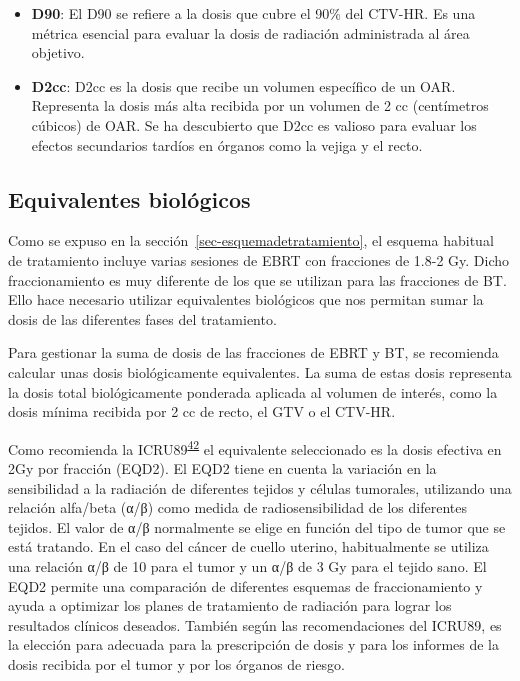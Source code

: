\documentclass[
  a4paper,
]{scrreprt}
\begin{document}
\begin{itemize}
\item
  \textbf{D90}: El D90 se refiere a la dosis que cubre el 90\% del
  CTV-HR. Es una métrica esencial para evaluar la dosis de radiación
  administrada al área objetivo.
\item
  \textbf{D2cc}: D2cc es la dosis que recibe un volumen específico de un
  OAR. Representa la dosis más alta recibida por un volumen de 2 cc
  (centímetros cúbicos) de OAR. Se ha descubierto que D2cc es valioso
  para evaluar los efectos secundarios tardíos en órganos como la vejiga
  y el recto.
\end{itemize}

\hypertarget{sec-equivalentesbiologicos}{%
\subsection{Equivalentes biológicos}\label{sec-equivalentesbiologicos}}

Como se expuso en la sección~\ref{sec-esquemadetratamiento}, el esquema
habitual de tratamiento incluye varias sesiones de EBRT con fracciones
de 1.8-2 Gy. Dicho fraccionamiento es muy diferente de los que se
utilizan para las fracciones de BT. Ello hace necesario utilizar
equivalentes biológicos que nos permitan sumar la dosis de las
diferentes fases del tratamiento.

Para gestionar la suma de dosis de las fracciones de EBRT y BT, se
recomienda calcular unas dosis biológicamente equivalentes. La suma de
estas dosis representa la dosis total biológicamente ponderada aplicada
al volumen de interés, como la dosis mínima recibida por 2 cc de recto,
el GTV o el CTV-HR.

Como recomienda la
ICRU89\textsuperscript{\protect\hyperlink{ref-ICRU89}{42}} el
equivalente seleccionado es la dosis efectiva en 2Gy por fracción
(EQD2). El EQD2 tiene en cuenta la variación en la sensibilidad a la
radiación de diferentes tejidos y células tumorales, utilizando una
relación alfa/beta (α/β) como medida de radiosensibilidad de los
diferentes tejidos. El valor de α/β normalmente se elige en función del
tipo de tumor que se está tratando. En el caso del cáncer de cuello
uterino, habitualmente se utiliza una relación α/β de 10 para el tumor y
un α/β de 3 Gy para el tejido sano. El EQD2 permite una comparación de
diferentes esquemas de fraccionamiento y ayuda a optimizar los planes de
tratamiento de radiación para lograr los resultados clínicos deseados.
También según las recomendaciones del ICRU89, es la elección para
adecuada para la prescripción de dosis y para los informes de la dosis
recibida por el tumor y por los órganos de riesgo.
\end{document}
